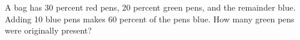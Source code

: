 A bag has 30 percent red pens, 20 percent green pens, and the remainder blue. Adding 10 blue pens makes 60 percent of the pens blue. How many green pens were originally present?
